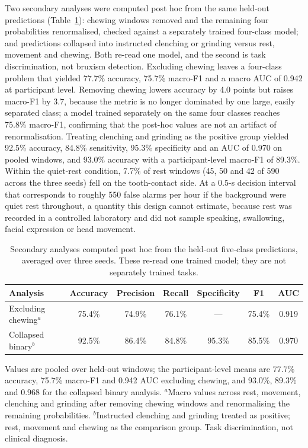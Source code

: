 \documentclass[journal]{IEEEtran}
\begin{document}
Two secondary analyses were computed post hoc from the same held-out predictions (Table~\ref{tab:sensitivity}): chewing windows removed and the remaining four probabilities renormalised, checked against a separately trained four-class model; and predictions collapsed into instructed clenching or grinding versus rest, movement and chewing. Both re-read one model, and the second is task discrimination, not bruxism detection. Excluding chewing leaves a four-class problem that yielded 77.7\% accuracy, 75.7\% macro-F1 and a macro AUC of 0.942 at participant level. Removing chewing lowers accuracy by 4.0 points but raises macro-F1 by 3.7, because the metric is no longer dominated by one large, easily separated class; a model trained separately on the same four classes reaches 75.8\% macro-F1, confirming that the post-hoc values are not an artifact of renormalisation. Treating clenching and grinding as the positive group yielded 92.5\% accuracy, 84.8\% sensitivity, 95.3\% specificity and an AUC of 0.970 on pooled windows, and 93.0\% accuracy with a participant-level macro-F1 of 89.3\%. Within the quiet-rest condition, 7.7\% of rest windows (45, 50 and 42 of 590 across the three seeds) fell on the tooth-contact side. At a 0.5-s decision interval that corresponds to roughly 550 false alarms per hour if the background were quiet rest throughout, a quantity this design cannot estimate, because rest was recorded in a controlled laboratory and did not sample speaking, swallowing, facial expression or head movement.

\begin{table}[!t]
  \caption{Secondary analyses computed post hoc from the held-out five-class predictions, averaged over three seeds. These re-read one trained model; they are not separately trained tasks.}
  \label{tab:sensitivity}
  \centering
  \footnotesize
  \begin{tabular*}{\textwidth}{@{\extracolsep{\fill}}lcccccc@{}}
    \toprule
    Analysis & Accuracy & Precision & Recall & Specificity & F1 & AUC \\
    \midrule
    Excluding chewing$^{a}$ & 75.4\% & 74.9\% & 76.1\% & --- & 75.4\% & 0.919 \\
    Collapsed binary$^{b}$ & 92.5\% & 86.4\% & 84.8\% & 95.3\% & 85.5\% & 0.970 \\
    \bottomrule
  \end{tabular*}
  \begin{flushleft}\footnotesize
  Values are pooled over held-out windows; the participant-level means are 77.7\% accuracy, 75.7\% macro-F1 and 0.942 AUC excluding chewing, and 93.0\%, 89.3\% and 0.968 for the collapsed binary analysis.
  $^{a}$Macro values across rest, movement, clenching and grinding after removing chewing windows and renormalising the remaining probabilities.
  $^{b}$Instructed clenching and grinding treated as positive; rest, movement and chewing as the comparison group. Task discrimination, not clinical diagnosis.
  \end{flushleft}
\end{table}
\end{document}
